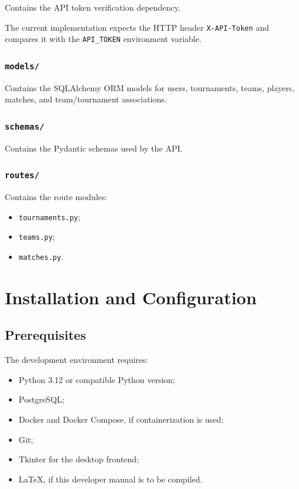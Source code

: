 \documentclass[12pt,a4paper]{article}
\begin{document}
Contains the API token verification dependency.

The current implementation expects the HTTP header
\texttt{X-API-Token} and compares it with the \texttt{API\_TOKEN}
environment variable.

\subsubsection{\texttt{models/}}

Contains the SQLAlchemy ORM models for users, tournaments, teams,
players, matches, and team/tournament associations.

\subsubsection{\texttt{schemas/}}

Contains the Pydantic schemas used by the API.

\subsubsection{\texttt{routes/}}

Contains the route modules:

\begin{itemize}
    \item \texttt{tournaments.py};
    \item \texttt{teams.py};
    \item \texttt{matches.py}.
\end{itemize}


\section{Installation and Configuration}

\subsection{Prerequisites}

The development environment requires:

\begin{itemize}
    \item Python 3.12 or compatible Python version;
    \item PostgreSQL;
    \item Docker and Docker Compose, if containerization is used;
    \item Git;
    \item Tkinter for the desktop frontend;
    \item LaTeX, if this developer manual is to be compiled.
\end{itemize}
\end{document}
